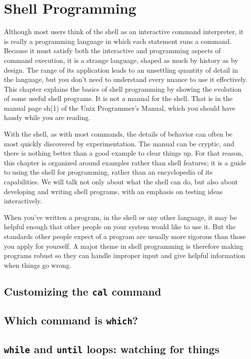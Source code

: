 \chapter{Shell Programming}

Although most users think of the shell as an interactive command interpreter, it
is really a programming language in which each statement runs a command. Because
it must satisfy both the interactive and programming aspects of command
execution, it is a strange language, shaped as much by history as by design. The
range of its application leads to an unsettling quantity of detail in the
language, but you don't need to understand every nuance to use it
effectively. This chapter explains the basics of shell programming by showing
the evolution of some useful shell programs. It is not a manual for the
shell. That is in the manual page sh(1) of the Unix Programmer's Manual, which
you should have handy while you are reading.

With the shell, as with most commands, the details of behavior can often be most
quickly discovered by experimentation. The manual can be cryptic, and there is
nothing better than a good example to clear things up. For that reason, this
chapter is organized around examples rather than shell features; it is a guide
to using the shell for programming, rather than an encyclopedia of its
capabilities. We will talk not only about what the shell can do, but also about
developing and writing shell programs, with an emphasis on testing ideas
interactively.

When you've written a program, in the shell or any other language, it may be
helpful enough that other people on your system would like to use it. But the
standards other people expect of a program are usually more rigorous than those
you apply for yourself. A major theme in shell programming is therefore making
programs robust so they can handle improper input and give helpful information
when things go wrong.

\section{Customizing the \texttt{cal} command}
\section{Which command is \texttt{which}?}
\section{\texttt{while} and \texttt{until} loops: watching for things}

